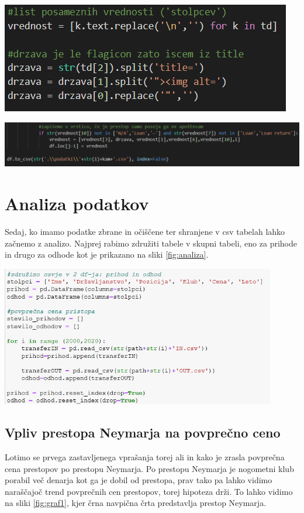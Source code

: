 \documentclass[a4paper, 12pt]{article}
\begin{document}
\pagebreak
\begin{center}
\includegraphics{html3}
\label{fig:htmlDrzava}

\includegraphics[width=1\textwidth]{html4}
\label{fig:htmlCSV}
\end{center}
\section{Analiza podatkov}
Sedaj, ko imamo podatke zbrane in očiščene ter shranjene v csv tabelah lahko začnemo z analizo. Najprej rabimo združiti tabele v skupni tabeli, eno za prihode in drugo za odhode kot je prikazano na sliki \ref{fig:analiza}. \\

\begin{center}
\includegraphics[width=0.9\textwidth]{analiza}
\label{fig:analiza}
\end{center}

\subsection{Vpliv prestopa Neymarja na povprečno ceno}
Lotimo se prvega zastavljenega vprašanja torej ali in kako je zrasla povprečna cena prestopov po prestopu Neymarja. Po prestopu Neymarja je nogometni klub porabil več denarja kot ga je dobil od prestopa, prav tako pa lahko vidimo naraščajoč trend povprečnih cen prestopov, torej hipoteza drži. To lahko vidimo na sliki \ref{fig:graf1}, kjer črna navpična črta predstavlja prestop Neymarja.
\end{document}
